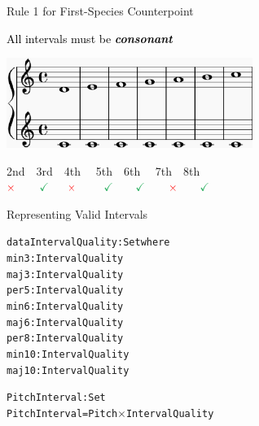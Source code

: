 \documentclass[14pt]{beamer}
\newcommand{\blue}[1]{\textcolor{bcolor}{#1}}
\newcommand{\black}[1]{\textcolor{black}{#1}}
\newcommand{\ablue}[1]{\textcolor{ablue}{#1}}
\newcommand{\agreen}[1]{\textcolor{agreen}{#1}}
\newcommand{\aorange}[1]{\textcolor{aorange}{#1}}
\newcommand{\ok}{\textcolor{okcolor}{\checkmark}}
\newcommand{\bad}{\textcolor{red}{\times}}
\newcommand{\empha}[1]{\textit{\textbf{#1}}}
\newcommand{\bscreen}[1]{\blue{
\begin{screen}
\begin{center}
\black{#1}
\end{center}
\end{screen}
}}
\begin{document}
\begin{frame}{Rule 1 for First-Species Counterpoint}
\bscreen{
All intervals must be \empha{consonant}
}

\vspace{-2mm}

\begin{center}
\includegraphics[width=8cm]{figures/interval.eps}
\end{center}

\vspace{-3mm}

\begin{small}
\hspace{2.8cm} 2nd \ \,3rd \ \,4th \ \ 5th \ \,6th \ \ 7th \ \,8th \\
\hspace{2.92cm} $\bad$ \ \ \ \,$\ok$ \ \ \,$\bad$ \ \ \ \ $\ok$ \ \ \ $\ok$ \ \ \ \,$\bad$ \ \ \ $\ok$
\end{small}
\end{frame}

\begin{frame}[fragile]{Representing Valid Intervals}
\begin{small}
\begin{alltt}
\aorange{data} \ablue{IntervalQuality} : \ablue{Set} \aorange{where}
  \agreen{min3}  : \ablue{IntervalQuality}
  \agreen{maj3}  : \ablue{IntervalQuality}
  \agreen{per5}  : \ablue{IntervalQuality}
  \agreen{min6}  : \ablue{IntervalQuality}
  \agreen{maj6}  : \ablue{IntervalQuality}
  \agreen{per8}  : \ablue{IntervalQuality}
  \agreen{min10} : \ablue{IntervalQuality}
  \agreen{maj10} : \ablue{IntervalQuality}

\ablue{PitchInterval} : \ablue{Set}
\ablue{PitchInterval} = \ablue{Pitch \(\times\) IntervalQuality}
\end{alltt}
\end{small}
\end{frame}
\end{document}
